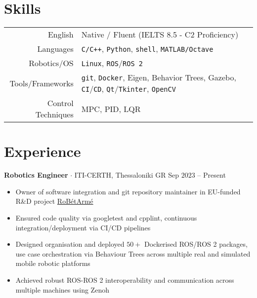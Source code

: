 \documentclass[a4paper,10pt,twoside]{article}
\newcommand{\verticalspacebetweensections}{\vspace{0em}}
\newcommand{\verticalspacebetweensectionandcontent}{\vspace{0.4em}}
\newcommand{\verticalspaceafteritem}{\vspace{-0.8em}}
\begin{document}
\section{\textbf{Skills}}\verticalspacebetweensectionandcontent

\begin{center}
\begin{tabular}{rl}
English & Native / Fluent (IELTS 8.5 - C2 Proficiency) \\
Languages & \texttt{C/C++}, \texttt{Python}, \texttt{shell}, \texttt{MATLAB/Octave} \\
Robotics/OS & \texttt{Linux},  \texttt{ROS}/\texttt{ROS 2} \\
Tools/Frameworks & \texttt{git}, \texttt{Docker}, Eigen, Behavior Trees, Gazebo, \texttt{CI}/\texttt{CD}, \texttt{Qt}/\texttt{Tkinter}, \texttt{OpenCV} \\
Control Techniques & MPC, PID, LQR
\end{tabular}
\end{center}
\verticalspacebetweensections

\section{\textbf{Experience}}\verticalspacebetweensectionandcontent

  \noindent\textbf{Robotics Engineer} $\cdot$ ITI-CERTH, Thessaloniki GR \hfill {\small \textcolor{datecolour}{Sep $2023$ -- Present}} \\
  \begin{minipage}[t]{\textwidth}
    \begin{itemize}
      \item Owner of software integration and git repository maintainer in EU-funded R\&D project \href{https://www.robetarme-project.eu/}{RoBétArmé}\verticalspaceafteritem
      \item Ensured code quality via googletest and cpplint, continuous integration/deployment via CI/CD pipelines\verticalspaceafteritem
      \item Designed organisation and deployed $50+$ Dockerised ROS/ROS 2 packages, use case orchestration via Behaviour Trees across multiple real and simulated mobile robotic platforms \verticalspaceafteritem
      \item Achieved robust ROS-ROS 2 interoperability and communication across multiple machines using Zenoh
    \end{itemize}
  \end{minipage} \\[0.2em]
\end{document}
